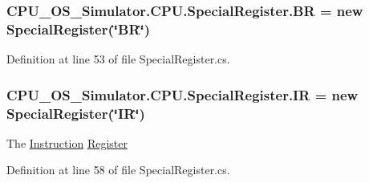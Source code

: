 \subsubsection[{B\+R}]{ C\+P\+U\+\_\+\+O\+S\+\_\+\+Simulator.\+C\+P\+U.\+Special\+Register.\+B\+R = new {\bf Special\+Register}(\char`\"{}B\+R\char`\"{})\hspace{0.3cm}{\ttfamily [static]}}\label{class_c_p_u___o_s___simulator_1_1_c_p_u_1_1_special_register_a08c44f677cc5e830000382725ce8ab9f}






Definition at line 53 of file Special\+Register.\+cs.

\hypertarget{class_c_p_u___o_s___simulator_1_1_c_p_u_1_1_special_register_a96fde61578e06f00ab7b19a4b05b9885}{}
\subsubsection[{I\+R}]{ C\+P\+U\+\_\+\+O\+S\+\_\+\+Simulator.\+C\+P\+U.\+Special\+Register.\+I\+R = new {\bf Special\+Register}(\char`\"{}I\+R\char`\"{})\hspace{0.3cm}{\ttfamily [static]}}\label{class_c_p_u___o_s___simulator_1_1_c_p_u_1_1_special_register_a96fde61578e06f00ab7b19a4b05b9885}


The \hyperlink{class_c_p_u___o_s___simulator_1_1_c_p_u_1_1_instruction}{Instruction} \hyperlink{class_c_p_u___o_s___simulator_1_1_c_p_u_1_1_register}{Register} 



Definition at line 58 of file Special\+Register.\+cs.

\hypertarget{class_c_p_u___o_s___simulator_1_1_c_p_u_1_1_special_register_a2ae89cee8b74f9985f43ee4e6f994bad}{}
